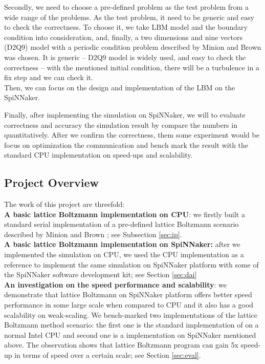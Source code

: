 Secondly, we need to choose a pre-defined problem as the test problem from a wide range of the problems. As the test problem, it need to be generic and easy to check the correctness. To choose it, we take LBM model and the boundary condition into consideration, and, finally, a two dimensions and nine vectors (D2Q9) model with a periodic condition problem described by Minion and Brown \cite{minion1997performance} was chosen. It is generic -- D2Q9 model is widely used, and easy to check the correctness -- with the mentioned initial condition, there will be a turbulence in a fix step and we can check it.\\

Then, we can focus on the design and implementation of the LBM on the SpiNNaker.

Finally, after implementing the simulation on SpiNNaker, we will to evaluate correctness and accuracy the simulation result by compare the numbers in quantitatively. After we confirm the correctness, them some experiment would be focus on optimization the communication and bench mark the result with the standard CPU implementation on speed-ups and scalability.\\

\subsection{Project Overview}

The work of this project are threefold:\\

 \textbf{A basic lattice Boltzmann implementation on CPU}: we firstly built a standard serial implementation of a pre-defined lattice Boltzmann scenario described by Minion and Brown \cite{minion1997performance}; see Subsection \ref{sec:ip}. \\

 \textbf{A basic lattice Boltzmann implementation on SpiNNaker:} after we implemented the simulation on CPU, we used the CPU implementation as a reference to implement the same simulation on SpiNNaker platform with some of the SpiNNaker software development kit; see Section \ref{sec:dai}\\

\textbf{An investigation on the speed performance and scalability}: we demonstrate that lattice Boltzmann on SpiNNaker platform offers better speed performance in some large scale when compared to CPU and it also has a good scalability on weak-scaling. We bench-marked two implementations of the lattice Boltzmann method scenario: the first one is the standard implementation of on a normal Intel CPU and second one is a implementation on SpiNNaker mentioned above. The observation shows that lattice Boltzmann program can gain 5x speed-up in terms of speed over a certain scale; see Section \ref{sec:eval}.




